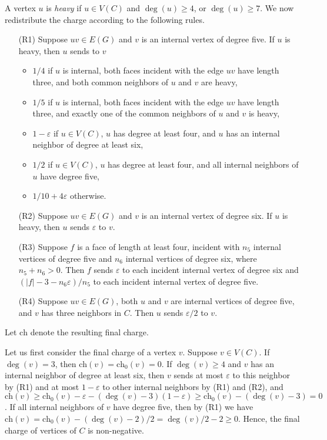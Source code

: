 \documentclass[12pt,twoside,openright,a4paper]{book}
\newcommand{\initch}{\text{ch}_0}
\newcommand{\finch}{\text{ch}}
\begin{document}
A vertex $u$ is \emph{heavy} if $u\in V(C)$ and $\deg(u)\ge 4$, or $\deg(u)\ge 7$.
We now redistribute the charge according to the following rules.
\begin{itemize}
\item[(R1)] Suppose $uv\in E(G)$ and $v$ is an internal vertex of degree five.
If $u$ is heavy, then $u$ sends to $v$
\begin{itemize}
\item $1/4$ if $u$ is internal, both faces incident with the edge $uv$ have length
three, and both common neighbors of $u$ and $v$ are heavy,
\item $1/5$ if $u$ is internal, both faces incident with the edge $uv$ have length three,
and exactly one of the common neighbors of $u$ and $v$ is heavy,
\item $1-\varepsilon$ if $u\in V(C)$, $u$ has degree at least four, and $u$ has an internal neighbor of degree at least six,
\item $1/2$ if $u\in V(C)$, $u$ has degree at least four, and all internal neighbors of $u$ have degree five,
\item $1/10+4\varepsilon$ otherwise.
\end{itemize}
\item[(R2)] Suppose $uv\in E(G)$ and $v$ is an internal vertex of degree six.
If $u$ is heavy, then $u$ sends $\varepsilon$ to $v$.
\item[(R3)] Suppose $f$ is a face of length at least four, incident with
$n_5$ internal vertices of degree five and $n_6$ internal vertices of degree six, where $n_5+n_6>0$.
Then $f$ sends $\varepsilon$ to each incident internal vertex of degree six and
$(|f|-3-n_6\varepsilon)/n_5$ to each incident internal vertex of degree five.
\item[(R4)] Suppose $uv\in E(G)$, both $u$ and $v$ are internal vertices of degree five,
and $v$ has three neighbors in $C$. Then $u$ sends $\varepsilon/2$ to $v$.
\end{itemize}
Let $\finch$ denote the resulting final charge.

Let us first consider the final charge of a vertex $v$.  Suppose $v\in V(C)$.
If $\deg(v)=3$, then $\finch(v)=\initch(v)=0$.  If $\deg(v)\ge 4$ and $v$ has an internal neighbor of degree at least
six, then $v$ sends at most $\varepsilon$ to this neighbor by (R1) and at most $1-\varepsilon$ to other internal neighbors
by (R1) and (R2), and $\finch(v)\ge \initch(v)-\varepsilon-(\deg(v)-3)(1-\varepsilon)\ge\initch(v)-(\deg(v)-3)=0$.
If all internal neighbors of $v$ have degree five, then by (R1) we have
$\finch(v)=\initch(v)-(\deg(v)-2)/2=\deg(v)/2-2\ge 0$.  Hence, the final charge of vertices of $C$ is non-negative.
\end{document}
